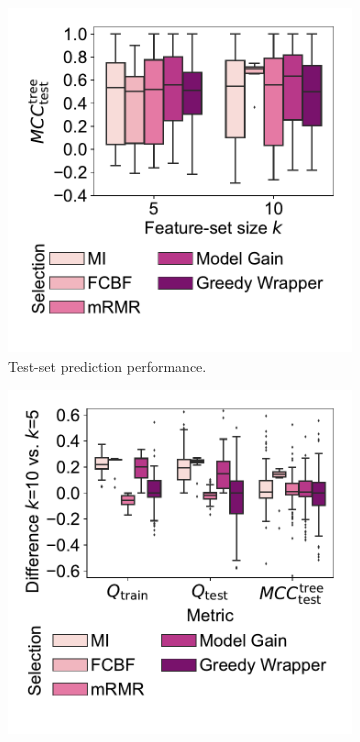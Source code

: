 \documentclass{article}
\theoremstyle{definition}
\begin{document}
\begin{figure}[t]
	\centering
	\begin{subfigure}[t]{0.48\textwidth}
		\centering
		\includegraphics[width=\textwidth, trim=15 40 15 15, clip]{plots/afs-impact-fs-method-k-decision-tree-test-mcc.pdf}
		\caption{Test-set prediction performance.}
		\label{fig:afs:impact-fs-method-k-decision-tree-test-mcc}
	\end{subfigure}
	\hfill
	\begin{subfigure}[t]{0.48\textwidth}
		\centering
		\includegraphics[width=\textwidth, trim=15 40 15 15, clip]{plots/afs-impact-fs-method-k-metric-diff.pdf}

\end{subfigure}
\end{figure}
\end{document}
